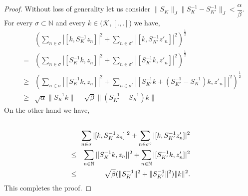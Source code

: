 \documentclass[article,12pt]{amsart}
\begin{document}
\begin{proof}
	Without loss of generality let us  consider  $\|S_K\|_J \|S_K^{-1} - S^{-1}_{K'}\|_J < \dfrac{\alpha}{\beta}$. 
	For every $\sigma \subset \mathbb{N}$ and every $k \in (\mathcal{K}, [., .]$) we have,
	\begin{eqnarray*}
		&& \left (\sum\limits_{n \in \sigma} |[k, S^{-1}_Kz_n]|^2 + \sum\limits_{n \in \sigma^c} |[k, S^{-1}_{K'}z'_n]|^2 \right)^\frac{1}{2} \\
		&=& \left(\sum\limits_{n\in\sigma}|[S^{-1}_Kk, z_n]|^2 + \sum\limits_{n \in \sigma^c} |[S^{-1}_{K'}k, z'_n]|^2\right)^\frac{1}{2}\\ 
		&\geq& \left(\sum\limits_{n\in\sigma}|[S^{-1}_Kk, z_n]|^2 + \sum\limits_{n \in \sigma^c} |[S^{-1}_{K'}k +(S^{-1}_{K'} - S^{-1}_K)k, z'_n]|^2\right)^\frac{1}{2}
	\\	&\geq& \sqrt{\alpha} \|S^{-1}_Kk\| - \sqrt{\beta} \|(S^{-1}_{K'} - S^{-1}_K)k\|
\end{eqnarray*}
		On the other hand we have,
	\begin{eqnarray*}
			\\&&\hspace{-1cm}\sum\limits_{n \in \sigma} |[k, S^{-1}_Kz_n]|^2 + \sum\limits_{n \in \sigma^c} |[k, S^{-1}_{K'}z'_n]|^2 \\&\leq& \sum\limits_{n \in \mathbb{N}} |[S^{-1}_Kk, z_n]|^2 + \sum\limits_{n \in \mathbb{N}} |[S^{-1}_{K'}k, z'_n]|^2 \\&\leq& \sqrt{\beta}(\|S^{-1}_K\|^2 + \|S^{-1}_{K'}\|^2)\|k\|^2.
	\end{eqnarray*}
	This completes the proof.
%	
%	
	
\end{proof}
\end{document}
